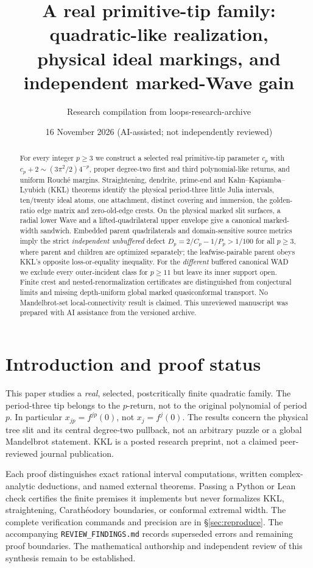 \documentclass[11pt,reqno]{amsart}
\title[Real primitive tips and marked Waves]{A real primitive-tip family: quadratic-like realization,\\ physical ideal markings, and independent marked-Wave gain}
\author{Research compilation from loops-research-archive}
\date{16 November 2026 (AI-assisted; not independently reviewed)}
\numberwithin{equation}{section}
\theoremstyle{definition}
\begin{document}
\begin{abstract}
For every integer $p\ge3$ we construct a selected real primitive-tip parameter $c_p$ with $c_p+2\sim(3\pi^2/2)4^{-p}$, proper degree-two first and third polynomial-like returns, and uniform Rouch\'e margins.  Straightening, dendrite, prime-end and Kahn--Kapiamba--Lyubich (KKL) theorems identify the physical period-three little Julia intervals, ten/twenty ideal atoms, one attachment, distinct covering and immersion, the golden-ratio edge matrix and zero-old-edge crests.  On the physical marked slit surfaces, a radial lower Wave and a lifted-quadrilateral upper envelope give a canonical marked-width sandwich.  Embedded parent quadrilaterals and domain-sensitive source metrics imply the strict \emph{independent unbuffered} defect $D_p=2/C_p-1/P_p>1/100$ for all $p\ge3$, where parent and children are optimized separately; the leafwise-pairable parent obeys KKL's opposite loss-or-equality inequality.  For the \emph{different} buffered canonical WAD we exclude every outer-incident class for $p\ge11$ but leave its inner support open.  Finite crest and nested-renormalization certificates are distinguished from conjectural limits and missing depth-uniform global marked quasiconformal transport.  No Mandelbrot-set local-connectivity result is claimed.  This unreviewed manuscript was prepared with AI assistance from the versioned archive.
\end{abstract}
\maketitle
\tableofcontents
\section{Introduction and proof status}
This paper studies a \emph{real}, selected, postcritically finite quadratic family.  The period-three tip belongs to the $p$-return, not to the original polynomial of period $p$.  In particular $x_{jp}=f^{jp}(0)$, not $x_j=f^j(0)$.  The results concern the physical tree slit and its central degree-two pullback, not an arbitrary puzzle or a global Mandelbrot statement.  KKL \cite{KKL2026} is a posted research preprint, not a claimed peer-reviewed journal publication.

Each proof distinguishes exact rational interval computations, written complex-analytic deductions, and named external theorems.  Passing a Python or Lean check certifies the finite premises it implements but never formalizes KKL, straightening, Carath\'eodory boundaries, or conformal extremal width.  The complete verification commands and precision are in \S\ref{sec:reproduce}.  The accompanying \texttt{REVIEW\_FINDINGS.md} records superseded errors and remaining proof boundaries.  The mathematical authorship and independent review of this synthesis remain to be established.








\end{document}
